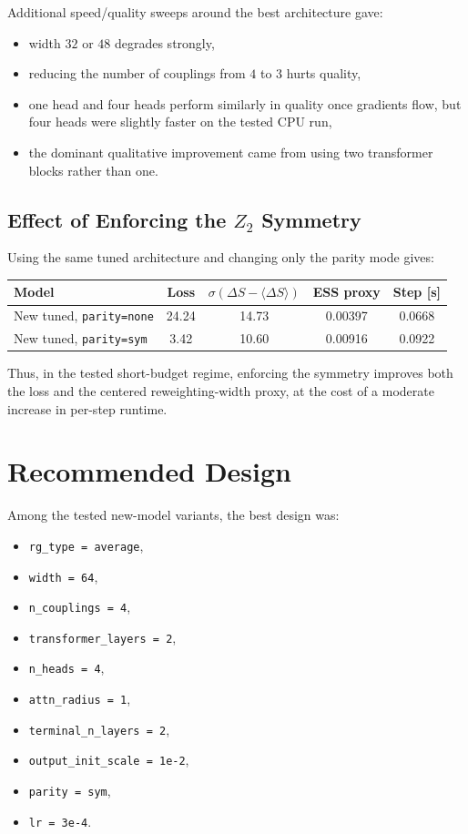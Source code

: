 \documentclass[11pt]{article}
\begin{document}
Additional speed/quality sweeps around the best architecture gave:
\begin{itemize}
\item width $32$ or $48$ degrades strongly,
\item reducing the number of couplings from $4$ to $3$ hurts quality,
\item one head and four heads perform similarly in quality once gradients flow,
but four heads were slightly faster on the tested CPU run,
\item the dominant qualitative improvement came from using two transformer
blocks rather than one.
\end{itemize}

\subsection{Effect of Enforcing the $Z_2$ Symmetry}

Using the same tuned architecture and changing only the parity mode gives:

\begin{center}
\begin{tabular}{lcccc}
\toprule
Model & Loss & $\sigma(\Delta S-\langle \Delta S\rangle)$ & ESS proxy & Step [s] \\
\midrule
New tuned, \texttt{parity=none} & 24.24 & 14.73 & 0.00397 & 0.0668 \\
New tuned, \texttt{parity=sym} & 3.42 & 10.60 & 0.00916 & 0.0922 \\
\bottomrule
\end{tabular}
\end{center}

Thus, in the tested short-budget regime, enforcing the symmetry improves both
the loss and the centered reweighting-width proxy, at the cost of a moderate
increase in per-step runtime.

\section{Recommended Design}

Among the tested new-model variants, the best design was:
\begin{itemize}
\item \texttt{rg\_type = average},
\item \texttt{width = 64},
\item \texttt{n\_couplings = 4},
\item \texttt{transformer\_layers = 2},
\item \texttt{n\_heads = 4},
\item \texttt{attn\_radius = 1},
\item \texttt{terminal\_n\_layers = 2},
\item \texttt{output\_init\_scale = 1e-2},
\item \texttt{parity = sym},
\item \texttt{lr = 3e-4}.
\end{itemize}
\end{document}
